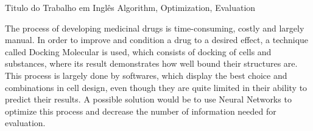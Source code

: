 \documentclass[tcc, capa]{texucpel}
\begin{document}

\begin{abstract}
O processo de desenvolvimento de drogas medicinais é demorado,custoso e em grande parte manual.
Para melhorar e condicionar uma droga a um efeito desejado, utiliza-se uma técnica chamada Docking Molecular, que consiste em realizar atracamento de células e substâncias,onde o seu resultado demonstra o quão bem ligadas suas estruturas estão.Este processo é feito em grande parte por softwares, que exibem a melhor opção e combinações no design das células, ainda que estejam bem limitados em sua capacidade de predizer seus resultados.Uma possível solução seria utilizar Redes Neurais para otimizar este processo e diminuir o número de informações necessárias passadas para avaliação.
\end{abstract}

\begin{englishabstract}
  {Titulo do Trabalho em Inglês}
  {Algorithm, Optimization, Evaluation}  
  
The process of developing medicinal drugs is time-consuming, costly and largely manual.
In order to improve and condition a drug to a desired effect, a technique called Docking Molecular is used, which consists of docking of cells and substances, where its result demonstrates how well bound their structures are. \\
This process is largely done by softwares, which display the best choice and combinations in cell design, even though they are quite limited in their ability to predict their results.
A possible solution would be to use Neural Networks to optimize this process and decrease the number of information needed for evaluation.

\end{englishabstract}
\end{document}
